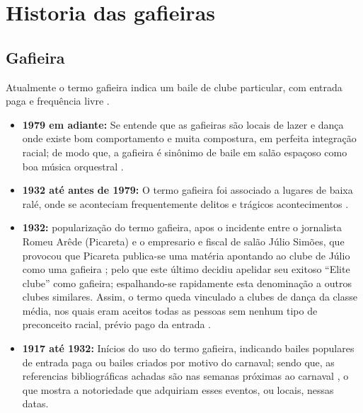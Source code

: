 

\chapter{Historia das gafieiras}

\section{Gafieira}
\label{def:Gafieira}
Atualmente o termo gafieira indica um baile de clube particular, com entrada paga e frequência livre \cite[pp. 10]{respeitojournalbrasil1}. 

\begin{itemize}
\item \textbf{1979 em adiante:} Se entende que as gafieiras são locais de lazer 
e dança onde existe bom comportamento e muita compostura,
em perfeita integração racial; de modo que, 
a gafieira é sinônimo de baile em salão espaçoso como boa música orquestral \cite[pp. 10-11]{respeitojournalbrasil1}.

\item \textbf{1932 até antes de 1979:} O termo gafieira foi associado a lugares de baixa ralé, onde 
se aconteciam frequentemente delitos e trágicos acontecimentos \cite[pp. 11]{gafieirajournalbrasil1} \cite[pp. 12]{gafieirajournaloradical1} \cite[pp. 10-11]{respeitojournalbrasil1}.

\item \textbf{1932:} popularização do termo gafieira, apos o
incidente entre o jornalista Romeu Arêde (Picareta) e o empresario e fiscal de salão Júlio Simões,
que provocou que  Picareta publica-se uma matéria apontando 
ao clube de Júlio como uma gafieira \cite[pp. 3 - cad. 3]{juliosimoes} 
\cite[pp. 21]{efege1974maxixe} \cite[pp. 78]{coutinho2006cronistas};
pelo que este último decidiu apelidar seu exitoso ``Elite clube'' como gafieira;
espalhando-se rapidamente esta denominação a outros clubes similares. 
Assim, o termo queda vinculado a clubes de dança da classe média,
nos quais eram aceitos todas as pessoas sem nenhum tipo de preconceito racial, 
prévio pago da entrada \cite[pp. 6 - cad. B]{entrevistajuliojournalbrasil1}.


\item \textbf{1917 até 1932:} 
Inícios do uso do termo gafieira, indicando bailes populares \cite[pp. 29]{instituto1987revista} de entrada paga
ou bailes criados por motivo do carnaval; sendo que, as referencias bibliográficas
achadas são nas semanas próximas ao carnaval \cite[pp. 4]{oldgafieira1} 
\cite[pp. 7]{oldgafieira2} \cite[pp. 4]{oldgafieira3} \cite[pp. 5]{oldgafieira4},
o que mostra a notoriedade que adquiriam esses eventos, ou locais, nessas datas.
\end{itemize}

